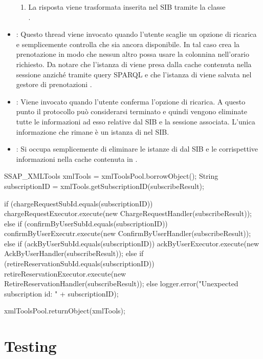 \begin{itemize}
\begin{enumerate}
		\item La risposta viene trasformata inserita nel SIB tramite la classe \\ .
	\end{enumerate}
	\item {}: Questo thread viene invocato quando l'utente scaglie un opzione di ricarica e semplicemente controlla che sia ancora disponibile. In tal caso crea la prenotazione in modo che nessun altro possa usare la colonnina nell'orario richiesto. Da notare che l'istanza di  viene presa dalla cache contenuta nella sessione anziché tramite query SPARQL e che l'istanza di  viene salvata nel gestore di prenotazioni .
	\item {}: Viene invocato quando l'utente conferma l'opzione di ricarica. A questo punto il protocollo può considerarsi terminato e quindi vengono eliminate tutte le informazioni ad esso relative dal SIB e la sessione associata. L'unica informazione che rimane è un istanza di  nel SIB.
	\item {}: Si occupa semplicemente di eliminare le istanze di  dal SIB e le corrispettive informazioni nella cache contenuta in .
\end{itemize}

\begin{java}[caption={Corpo di RequestDispatcher},label={lst:requestDispatcher}]
SSAP_XMLTools xmlTools = xmlToolsPool.borrowObject();
String subscriptionID = xmlTools.getSubscriptionID(subscribeResult);

if (chargeRequestSubId.equals(subscriptionID)) {
	chargeRequestExecutor.execute(new ChargeRequestHandler(subscribeResult));
} else if (confirmByUserSubId.equals(subscriptionID)) {
	confirmByUserExecutr.execute(new ConfirmByUserHandler(subscribeResult));
} else if (ackByUserSubId.equals(subscriptionID)) {
	ackByUserExecutor.execute(new AckByUserHandler(subscribeResult));
} else if (retireReservationSubId.equals(subscriptionID)) {
	retireReservationExecutor.execute(new RetireReservationHandler(subscribeResult));
} else {
	logger.error("Unexpected subscription id: " + subscriptionID);
}

xmlToolsPool.returnObject(xmlTools);
\end{java}	


\section{Testing}


